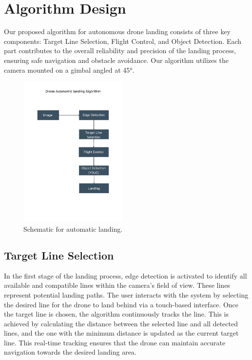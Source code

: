 \documentclass[unnumsec,webpdf,modern,large]{mam-authoring-template}%
\begin{document}
\section{Algorithm Design} \label{sec:algorithm}

Our proposed algorithm for autonomous drone landing consists of three key components: Target Line Selection, Flight Control, and Object Detection. Each part contributes to the overall reliability and precision of the landing process, ensuring safe navigation and obstacle avoidance.
Our algorithm utilizes the camera mounted on a gimbal angled at 45°.
\begin{figure}[H]
    \centering
    \includegraphics[width=0.48\textwidth]{Schematic_for_automatic_landing.png}  %
    \caption{Schematic for automatic landing.}
    \label{fig:Schematic_for_automatic_landing.}
\end{figure}

\subsection{Target Line Selection}
In the first stage of the landing process, edge detection is activated to identify all available and compatible lines within the camera's field of view. These lines represent potential landing paths. The user interacts with the system by selecting the desired line for the drone to land behind via a touch-based interface. Once the target line is chosen, the algorithm continuously tracks the line. This is achieved by calculating the distance between the selected line and all detected lines, and the one with the minimum distance is updated as the current target line. This real-time tracking ensures that the drone can maintain accurate navigation towards the desired landing area.
\end{document}
